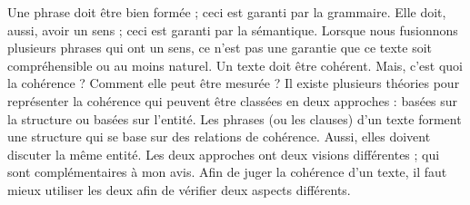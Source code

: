 \documentclass{KodeBook}
\begin{document}
\begin{discussion}
Une phrase doit être bien formée ; ceci est garanti par la grammaire. 
Elle doit, aussi, avoir un sens ; ceci est garanti par la sémantique. 
Lorsque nous fusionnons plusieurs phrases qui ont un sens, ce n'est pas une garantie que ce texte soit compréhensible ou au moins naturel. 
Un texte doit être cohérent. 
Mais, c'est quoi la cohérence ? Comment elle peut être mesurée ?
Il existe plusieurs théories pour représenter la cohérence qui peuvent être classées en deux approches : basées sur la structure ou basées sur l'entité. 
Les phrases (ou les clauses) d'un texte forment une structure qui se base sur des relations de cohérence. 
Aussi, elles doivent discuter la même entité.
Les deux approches ont deux visions différentes ; qui sont complémentaires à mon avis. 
Afin de juger la cohérence d'un texte, il faut mieux utiliser les deux afin de vérifier deux aspects différents.

\end{discussion}

\ifx\wholebook\relax\else
% 
% 
	
\end{document}

